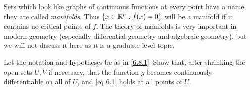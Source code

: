 \begin{rmk}\label{6.8.4}
  Sets which look like graphs of continuous functions at every point have a name, they are called \emph{manifolds}.
  Thus \(\left\lbrace x \in \mathbb{R}^n : f(x) = 0\right\rbrace\) will be a manifold if it contains no critical points of \(f\).
  The theory of manifolds is very important in modern geometry (especially differential geometry and algebraic geometry), but we will not discuss it here as it is a graduate level topic.
\end{rmk}

\exercisesection

\begin{ex}\label{ex:6.8.1}
  Let the notation and hypotheses be as in \cref{6.8.1}.
  Show that, after shrinking the open sets \(U, V\) if necessary, that the function \(g\) becomes continuously differentiable on all of \(U\), and \cref{eq 6.1} holds at all points of \(U\).
\end{ex}
